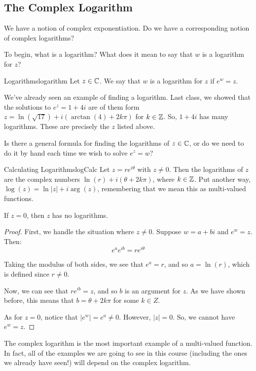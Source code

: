 \subsection{The Complex Logarithm}

We have a notion of complex exponentiation. Do we have a corresponding notion of complex logarithms?

To begin, what is a logarithm? What does it mean to say that $w$ is a logarithm for $z$?

\begin{defbo}{Logarithms}{logarithm} 
Let $z\in \mathbb{C}$. We say that $w$ is a logarithm for $z$ if $e^w = z$.
\end{defbo}

We've already seen an example of finding a logarithm. Last class, we showed that the solutions to $e^{z} = 1 + 4i$ are of them form $z = \ln(\sqrt{17}) + i(\arctan(4) + 2k\pi)$ for $k\in \mathbb{Z}$. So, $1 + 4i$ has many logarithms. These are precisely the $z$ listed above.


Is there a general formula for finding the logarithms of $z\in \mathbb{C}$, or do we need to do it by hand each time we wish to solve $e^z = w$?

\begin{thmbo}{Calculating Logarithms}{logCalc}
 Let $z = re^{i\theta}$ with $z\ne 0$. Then the logarithms of $z$ are the complex numbers $\ln(r) + i(\theta + 2k\pi)$, where $k\in \mathbb{Z}$. Put another way, $\log(z) = \ln|z| + i\arg(z)$, remembering that we mean this as multi-valued functions.


If $z = 0$, then $z$ has no logarithms.
\end{thmbo}

\begin{proof} First, we handle the situation where $z\ne 0$. Suppose $w = a +bi$ and $e^w = z$. Then:
$$e^ae^{ib} = re^{i\theta}$$

Taking the modulus of both sides, we see that $e^a = r$, and so $a = \ln(r)$, which is defined since $r\ne 0$.

Now, we can see that $re^{ib} = z$, and so $b$ is an argument for $z$. As we have shown before, this means that $b = \theta + 2k\pi$ for some $k\in Z$.

As for $z = 0$, notice that $|e^w| = e^a \ne 0$. However, $|z| = 0$. So, we cannot have $e^w = z$.

\end{proof}

The complex logarithm is the most important example of a multi-valued function. In fact, all of the examples we are going to see in this course (including the ones we already have seen!) will depend on the complex logarithm.

